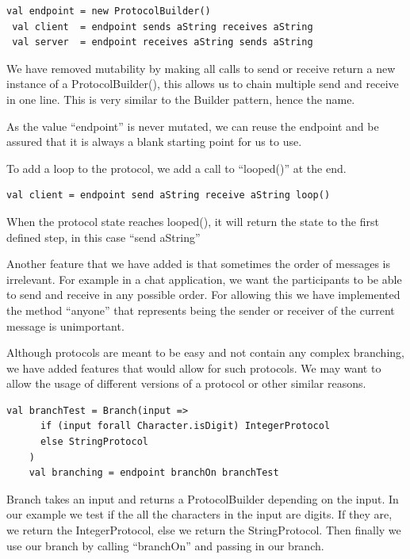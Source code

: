 \begin{lstlisting}[style=myScalastyle]
 val endpoint = new ProtocolBuilder()
 val client  = endpoint sends aString receives aString
 val server  = endpoint receives aString sends aString
\end{lstlisting}
We have removed mutability by making all calls to send or receive return a new instance of a ProtocolBuilder(), this allows us to chain multiple send and receive in one line. This is very similar to the Builder pattern, hence the name.

As the value ``endpoint'' is never mutated, we can reuse the endpoint and be assured that it is always a blank starting point for us to use. 

To add a loop to the protocol, we add a call to ``looped()'' at the end.
\begin{lstlisting}[style=myScalastyle]
 val client = endpoint send aString receive aString loop()
\end{lstlisting}
When the protocol state reaches looped(), it will return the state to the first defined step, in this case ``send aString'' 

Another feature that we have added is that sometimes the order of messages is irrelevant. For example in a chat application, we want the participants to be able to send and receive in any possible order. For allowing this we have implemented the method ``anyone'' that represents being the sender or receiver of the current message is unimportant.

Although protocols are meant to be easy and not contain any complex branching, we have added features that would allow for such protocols. We may want to allow the usage of different versions of a protocol or other similar reasons.
\begin{lstlisting}[style=myScalastyle]
    val branchTest = Branch(input =>
      if (input forall Character.isDigit) IntegerProtocol
      else StringProtocol
    )
    val branching = endpoint branchOn branchTest
\end{lstlisting}
Branch takes an input and returns a ProtocolBuilder depending on the input. In our example we test if the all the characters in the input are digits. If they are, we return the IntegerProtocol, else we return the StringProtocol. Then finally we use our branch by calling ``branchOn'' and passing in our branch. 


